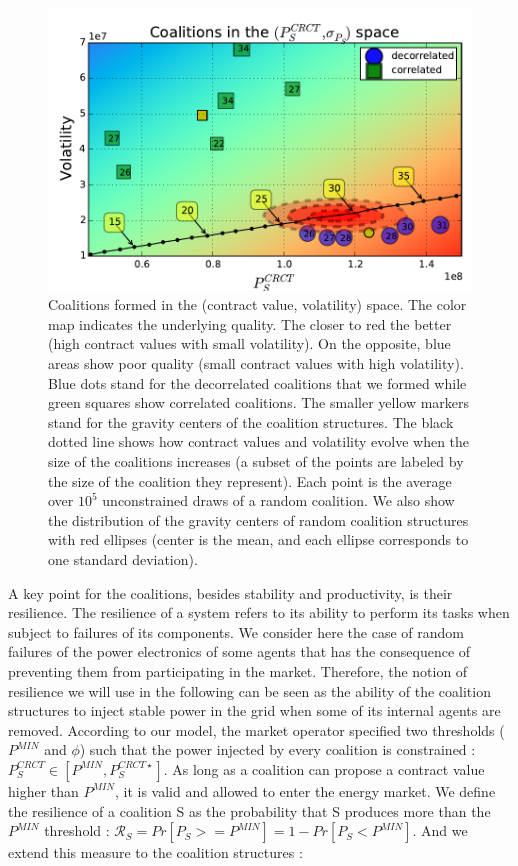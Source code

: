 \documentclass[journal]{IEEEtran}
\begin{document}
\begin{figure}
	\begin{center}
		\includegraphics[scale=.45]{./figs/figure_5}
		\caption{{\footnotesize Coalitions formed in the (contract value, volatility) space. The color map indicates the underlying quality. The closer to red the better (high contract values with small volatility). On the opposite, blue areas show poor quality (small contract values with high volatility). Blue dots stand for the decorrelated coalitions that we formed while green squares show correlated coalitions. The smaller yellow markers stand for the gravity centers of the coalition structures. The black dotted line shows how contract values and volatility evolve  when the size of the coalitions increases (a subset of the points are labeled by the size of the coalition they represent). Each point is the average over $ 10^{5} $ unconstrained draws of a random coalition. We also show the distribution of the gravity centers of random coalition structures with red ellipses (center is the mean, and each ellipse corresponds to one  standard deviation).}}
		\label{fig:coalitions}
	\end{center}
\end{figure}

A key point for the coalitions, besides stability and productivity, is their resilience. The resilience of a system refers to its ability to perform its tasks when subject to failures of its components. We consider here the case of random failures of the power electronics of some agents that has the consequence of preventing them from participating in the market. Therefore, the notion of resilience we will use in the following can be seen as the ability of the coalition structures to inject stable power in the grid when some of its internal agents are removed. According to our model, the market operator specified two thresholds ($P^{MIN}$ and $ \phi $) such that the power injected by every coalition is constrained : $ P_{S}^{CRCT} \in [P^{MIN}, P_{S}^{CRCT \star}] $. As long as a coalition can propose a contract value higher than $ P^{MIN} $, it is valid and allowed to enter the energy market. We define the resilience of a coalition S as the probability that S produces more than the $ P^{MIN} $ threshold : $ \mathcal{R}_{S} = Pr[P_{S} >= P^{MIN}] = 1 - Pr[P_{S} < P^{MIN}] $. And we extend this measure to the coalition structures :
\end{document}
